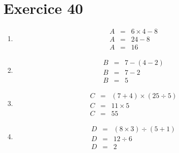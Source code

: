 \documentclass[12pt,a4paper]{extarticle}
\begin{document}
\section*{Exercice 40}

	\begin{multicols}{2}
		\begin{enumerate}[label=\alph*.]
			
			\item \begin{eqnarray*}
				A &=& 6 \times 4  - 8\\
				A &=& 24 - 8 \\
				A &=& 16
			\end{eqnarray*}
			
			\item \begin{eqnarray*}
				B &=& 7 - (4 - 2)\\
				B &=& 7 - 2\\
				B &=& 5
			\end{eqnarray*}
			
			\item \begin{eqnarray*}
				C &=& (7 + 4) \times (25 \div 5) \\
				C &=& 11 \times 5 \\
				C &=& 55
			\end{eqnarray*}
		
			\item \begin{eqnarray*}
				D &=& (8 \times 3) \div (5 + 1) \\
				D &=& 12 \div 6 \\
				D &=& 2
			\end{eqnarray*}
			
		\end{enumerate}
	\end{multicols}
\end{document}
